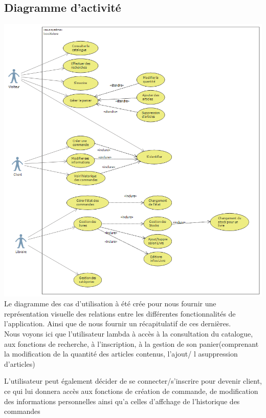 \subsection{Diagramme d'activité}
\includegraphics[scale=0.4]{Res/useCase.png}
Le diagramme des cas d'utilisation à été crée pour nous fournir une représentation visuelle
des relations entre les différentes fonctionnalités de l'application. Ainsi que de nous fournir un récapitulatif de ces dernières.\\

Nous voyons ici que l'utilisateur lambda à accès à la consultation du catalogue, aux fonctions de recherche, à l'inscription, à la gestion de son panier(comprenant la modification de la quantité des articles contenus, l'ajout/ l asuppression d'articles)

L'utilisateur peut également décider de se connecter/s'inscrire pour devenir client, ce qui lui donnera accès aux fonctions de création de commande, de modification des informations personnelles ainsi qu'a celles d'affchage de l'historique des commandes
\clearpage

